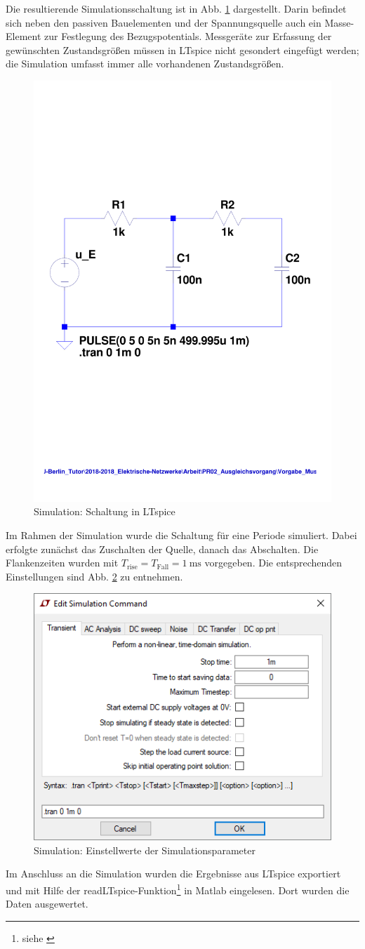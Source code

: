 %
Die resultierende Simulationsschaltung ist in Abb. \ref{fig:3_Sim_Schaltung} dargestellt. Darin befindet sich neben den passiven Bauelementen und der Spannungsquelle auch ein Masse-Element zur Festlegung des Bezugspotentials. Messgeräte zur Erfassung der gewünschten Zustandsgrößen müssen in LTspice nicht gesondert eingefügt werden; die Simulation umfasst immer alle vorhandenen Zustandsgrößen.
%
\begin{figure}[H]
  \centering
  \includegraphics[width=0.6\linewidth]{src/3_Sim_Schaltung.pdf}
  \caption{Simulation: Schaltung in LTspice}
  \label{fig:3_Sim_Schaltung}
\end{figure}
%
Im Rahmen der Simulation wurde die Schaltung für eine Periode simuliert. Dabei erfolgte zunächst das Zuschalten der Quelle, danach das Abschalten. Die Flankenzeiten wurden mit $T_\mathrm{rise} = T_\mathrm{Fall} = \SI{1}{\milli\second}$ vorgegeben. Die entsprechenden Einstellungen sind Abb. \ref{fig:3_Sim_Parameter} zu entnehmen.
%
\begin{figure}[H]
  \centering
  \includegraphics[width=0.7\linewidth]{src/3_Sim_Parameter.png}
  \caption{Simulation: Einstellwerte der Simulationsparameter}
  \label{fig:3_Sim_Parameter}
\end{figure}
%
Im Anschluss an die Simulation wurden die Ergebnisse aus LTspice exportiert und mit Hilfe der readLTspice-Funktion\footnote{siehe \cite{src:readLTspice}} in Matlab eingelesen. Dort wurden die Daten ausgewertet.
%
%
%